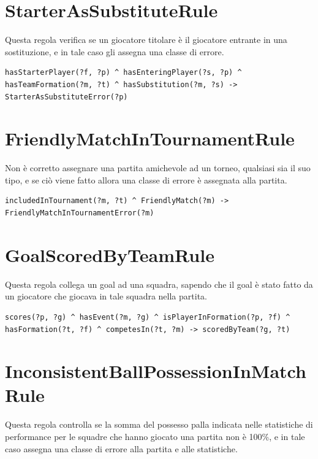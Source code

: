 \documentclass[11pt]{report} %
\begin{document}
\section{StarterAsSubstituteRule}

Questa regola verifica se un giocatore titolare è il giocatore entrante in una sostituzione, e in tale caso gli assegna una classe di errore.

\begin{lstlisting}[language=SWRL]
hasStarterPlayer(?f, ?p) ^ hasEnteringPlayer(?s, ?p) ^ hasTeamFormation(?m, ?t) ^ hasSubstitution(?m, ?s) -> StarterAsSubstituteError(?p)
\end{lstlisting}

\section{FriendlyMatchInTournamentRule}

Non è corretto assegnare una partita amichevole ad un torneo, qualsiasi sia il suo tipo, e se ciò viene fatto allora una classe di errore è assegnata alla partita. 

\begin{lstlisting}[language=SWRL]
includedInTournament(?m, ?t) ^ FriendlyMatch(?m) -> FriendlyMatchInTournamentError(?m)
\end{lstlisting}

\section{GoalScoredByTeamRule}

Questa regola collega un goal ad una squadra, sapendo che il goal è stato fatto da un giocatore che giocava in tale squadra nella partita.

\begin{lstlisting}[language=SWRL]
scores(?p, ?g) ^ hasEvent(?m, ?g) ^ isPlayerInFormation(?p, ?f) ^ hasFormation(?t, ?f) ^ competesIn(?t, ?m) -> scoredByTeam(?g, ?t)
\end{lstlisting}

\section{InconsistentBallPossessionInMatchRule}

Questa regola controlla se la somma del possesso palla indicata nelle statistiche di performance per le squadre che hanno giocato una partita non è 100\%, e in tale caso assegna una classe di errore alla partita e alle statistiche.
\end{document}

